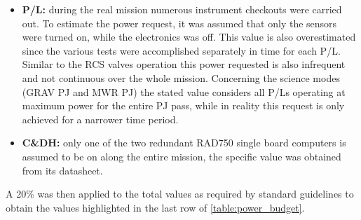 \begin{itemize}
    \item \textbf{P/L:} during the real mission numerous instrument checkouts were carried out. To estimate the power request, it was assumed that only the sensors were turned on, while the electronics was off. This value is also overestimated since the various tests were accomplished separately in time for each P/L. Similar to the RCS valves operation this power requested is also infrequent and not continuous over the whole mission. 
    Concerning the science modes (GRAV PJ and MWR PJ) the stated value considers all P/Ls operating at maximum power for the entire PJ pass, while in reality this request is only achieved for a narrower time period. \cite{LL_complete_mission} 
    \item \textbf{C\&DH:} only one of the two redundant RAD750 single board computers is assumed to be on along the entire mission, the specific value was obtained from its datasheet. \cite{C&DH_power}
\end{itemize}
A 20\% was then applied to the total values as required by standard guidelines \cite{esa_margins} to obtain the values highlighted in the last row of \autoref{table:power_budget}.